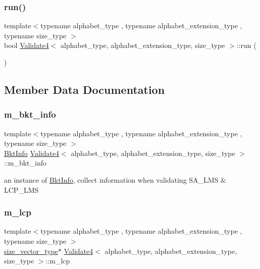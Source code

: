 \subsubsection{\texorpdfstring{run()}{run()}}
{\footnotesize\ttfamily template$<$typename alphabet\+\_\+type , typename alphabet\+\_\+extension\+\_\+type , typename size\+\_\+type $>$ \\
bool \hyperlink{class_validate4}{Validate4}$<$ alphabet\+\_\+type, alphabet\+\_\+extension\+\_\+type, size\+\_\+type $>$\+::run (\begin{DoxyParamCaption}{ }\end{DoxyParamCaption})\hspace{0.3cm}{\ttfamily [inline]}}



\subsection{Member Data Documentation}
\mbox{\label{class_validate4_a4f79c420ccec4e83e536fae655fe7a11}} 
\subsubsection{\texorpdfstring{m\+\_\+bkt\+\_\+info}{m\_bkt\_info}}
{\footnotesize\ttfamily template$<$typename alphabet\+\_\+type , typename alphabet\+\_\+extension\+\_\+type , typename size\+\_\+type $>$ \\
\hyperlink{struct_validate4_1_1_bkt_info}{Bkt\+Info} \hyperlink{class_validate4}{Validate4}$<$ alphabet\+\_\+type, alphabet\+\_\+extension\+\_\+type, size\+\_\+type $>$\+::m\+\_\+bkt\+\_\+info\hspace{0.3cm}{\ttfamily [private]}}



an instance of \hyperlink{struct_validate4_1_1_bkt_info}{Bkt\+Info}, collect information when validating S\+A\+\_\+\+L\+MS \& L\+C\+P\+\_\+\+L\+MS 

\mbox{\label{class_validate4_a41b6536affab0d38c674648c9ee58959}} 
\subsubsection{\texorpdfstring{m\+\_\+lcp}{m\_lcp}}
{\footnotesize\ttfamily template$<$typename alphabet\+\_\+type , typename alphabet\+\_\+extension\+\_\+type , typename size\+\_\+type $>$ \\
\hyperlink{class_validate4_a46ea31a0a4b23f583806792160421d15}{size\+\_\+vector\+\_\+type}$\ast$ \hyperlink{class_validate4}{Validate4}$<$ alphabet\+\_\+type, alphabet\+\_\+extension\+\_\+type, size\+\_\+type $>$\+::m\+\_\+lcp\hspace{0.3cm}{\ttfamily [private]}}

